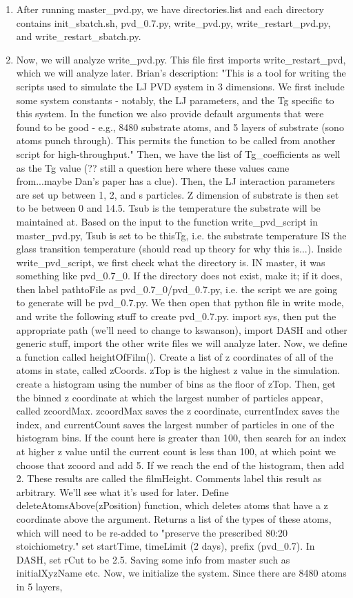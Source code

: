 \documentclass[12pt,reqno]{amsart}
\numberwithin{equation}{section}
\begin{document}
\begin{enumerate}
\item After running master\_pvd.py, we have directories.list and each directory contains init\_sbatch.sh, pvd\_0.7.py, write\_pvd.py, write\_restart\_pvd.py, and write\_restart\_sbatch.py.  
\item Now, we will analyze write\_pvd.py.  This file first imports write\_restart\_pvd, which we will analyze later.  Brian's description: "This is a tool for writing the scripts used to simulate the LJ PVD system in 3 dimensions.  We first include some system constants - notably, the LJ parameters, and the Tg specific to this system.  In the function we also provide default arguments that were found to be good - e.g., 8480 substrate atoms, and 5 layers of substrate (sono atoms punch through).  This permits the function to be called from another script for high-throughput."  Then, we have the list of Tg\_coefficients as well as the Tg value (?? still a question here where these values came from...maybe Dan's paper has a clue).  Then, the LJ interaction parameters are set up between 1, 2, and s particles.  Z dimension of substrate is then set to be between 0 and 14.5.  Tsub is the temperature the substrate will be maintained at.  Based on the input to the function write\_pvd\_script in master\_pvd.py, Tsub is set to be thisTg, i.e. the substrate temperature IS the glass transition temperature (should read up theory for why this is...).  Inside write\_pvd\_script, we first check what the directory is.  IN master, it was something like pvd\_0.7\_0.  If the directory does not exist, make it; if it does, then label pathtoFile as pvd\_0.7\_0/pvd\_0.7.py, i.e. the script we are going to generate will be pvd\_0.7.py.  We then open that python file in write mode, and write the following stuff to create pvd\_0.7.py.  import sys, then put the appropriate path (we'll need to change to kswanson), import DASH and other generic stuff, import the other write files we will analyze later.  Now, we define a function called heightOfFilm().  Create a list of z coordinates of all of the atoms in state, called zCoords.  zTop is the highest z value in the simulation.  create a histogram using the number of bins as the floor of zTop.  Then, get the binned z coordinate at which the largest number of particles appear, called zcoordMax.  zcoordMax saves the z coordinate, currentIndex saves the index, and currentCount saves the largest number of particles in one of the histogram bins.    If the count here is greater than 100, then search for an index at higher z value until the current count is less than 100, at which point we choose that zcoord and add 5.  If we reach the end of the histogram, then add 2.  These results are called the filmHeight.  Comments label this result as arbitrary.  We'll see what it's used for later.  Define deleteAtomsAbove(zPosition) function, which deletes atoms that have a z coordinate above the argument.  Returns a list of the types of these atoms, which will need to be re-added to "preserve the prescribed 80:20 stoichiometry."  set startTime, timeLimit (2 days), prefix (pvd\_0.7).  In DASH, set rCut to be 2.5.  Saving some info from master such as initialXyzName etc.  Now, we initialize the system.  Since there are 8480 atoms in 5 layers, 
\end{enumerate}
\end{document}

